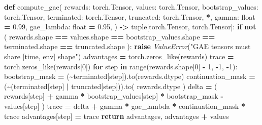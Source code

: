 \documentclass[
  chinese,
  11pt,
  letterpaper,
]{article}
\newenvironment{Shaded}{\begin{snugshade}}{\end{snugshade}}
\newcommand{\BuiltInTok}[1]{#1}
\newcommand{\ControlFlowTok}[1]{\textcolor[rgb]{0.13,0.29,0.53}{\textbf{#1}}}
\newcommand{\DecValTok}[1]{\textcolor[rgb]{0.00,0.00,0.81}{#1}}
\newcommand{\FloatTok}[1]{\textcolor[rgb]{0.00,0.00,0.81}{#1}}
\newcommand{\KeywordTok}[1]{\textcolor[rgb]{0.13,0.29,0.53}{\textbf{#1}}}
\newcommand{\NormalTok}[1]{#1}
\newcommand{\OperatorTok}[1]{\textcolor[rgb]{0.81,0.36,0.00}{\textbf{#1}}}
\newcommand{\PreprocessorTok}[1]{\textcolor[rgb]{0.56,0.35,0.01}{\textit{#1}}}
\newcommand{\StringTok}[1]{\textcolor[rgb]{0.31,0.60,0.02}{#1}}
\renewenvironment{Shaded}{\par\smallskip}{\par\smallskip}
\begin{document}
\begin{Shaded}
\begin{Highlighting}[]
\KeywordTok{def}\NormalTok{ compute\_gae(}
\NormalTok{    rewards: torch.Tensor,}
\NormalTok{    values: torch.Tensor,}
\NormalTok{    bootstrap\_values: torch.Tensor,}
\NormalTok{    terminated: torch.Tensor,}
\NormalTok{    truncated: torch.Tensor,}
    \OperatorTok{*}\NormalTok{,}
\NormalTok{    gamma: }\BuiltInTok{float} \OperatorTok{=} \FloatTok{0.99}\NormalTok{,}
\NormalTok{    gae\_lambda: }\BuiltInTok{float} \OperatorTok{=} \FloatTok{0.95}\NormalTok{,}
\NormalTok{) }\OperatorTok{{-}\textgreater{}} \BuiltInTok{tuple}\NormalTok{[torch.Tensor, torch.Tensor]:}
    \ControlFlowTok{if} \KeywordTok{not}\NormalTok{ (}
\NormalTok{        rewards.shape}
        \OperatorTok{==}\NormalTok{ values.shape}
        \OperatorTok{==}\NormalTok{ bootstrap\_values.shape}
        \OperatorTok{==}\NormalTok{ terminated.shape}
        \OperatorTok{==}\NormalTok{ truncated.shape}
\NormalTok{    ):}
        \ControlFlowTok{raise} \PreprocessorTok{ValueError}\NormalTok{(}\StringTok{"GAE tensors must share [time, env] shape"}\NormalTok{)}
\NormalTok{    advantages }\OperatorTok{=}\NormalTok{ torch.zeros\_like(rewards)}
\NormalTok{    trace }\OperatorTok{=}\NormalTok{ torch.zeros\_like(rewards[}\DecValTok{0}\NormalTok{])}
    \ControlFlowTok{for}\NormalTok{ step }\KeywordTok{in} \BuiltInTok{range}\NormalTok{(rewards.shape[}\DecValTok{0}\NormalTok{] }\OperatorTok{{-}} \DecValTok{1}\NormalTok{, }\OperatorTok{{-}}\DecValTok{1}\NormalTok{, }\OperatorTok{{-}}\DecValTok{1}\NormalTok{):}
\NormalTok{        bootstrap\_mask }\OperatorTok{=}\NormalTok{ (}\OperatorTok{\textasciitilde{}}\NormalTok{terminated[step]).to(rewards.dtype)}
\NormalTok{        continuation\_mask }\OperatorTok{=}\NormalTok{ (}\OperatorTok{\textasciitilde{}}\NormalTok{(terminated[step] }\OperatorTok{|}\NormalTok{ truncated[step])).to(}
\NormalTok{            rewards.dtype}
\NormalTok{        )}
\NormalTok{        delta }\OperatorTok{=}\NormalTok{ (}
\NormalTok{            rewards[step]}
            \OperatorTok{+}\NormalTok{ gamma }\OperatorTok{*}\NormalTok{ bootstrap\_values[step] }\OperatorTok{*}\NormalTok{ bootstrap\_mask}
            \OperatorTok{{-}}\NormalTok{ values[step]}
\NormalTok{        )}
\NormalTok{        trace }\OperatorTok{=}\NormalTok{ delta }\OperatorTok{+}\NormalTok{ gamma }\OperatorTok{*}\NormalTok{ gae\_lambda }\OperatorTok{*}\NormalTok{ continuation\_mask }\OperatorTok{*}\NormalTok{ trace}
\NormalTok{        advantages[step] }\OperatorTok{=}\NormalTok{ trace}
    \ControlFlowTok{return}\NormalTok{ advantages, advantages }\OperatorTok{+}\NormalTok{ values}



\end{Highlighting}
\end{Shaded}
\end{document}
